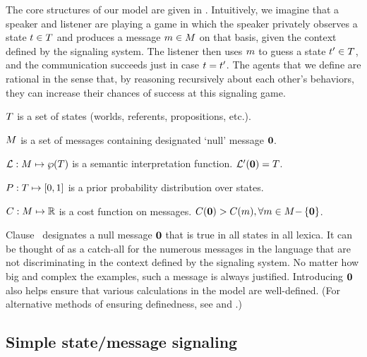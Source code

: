\documentclass{article}
\begin{document}
The core structures of our model are given in .
Intuitively, we imagine that a speaker and listener are playing a game
in which the speaker privately observes a state $t \in T$
and produces a message $m \in M$ on that basis, given the
context defined by the signaling system. The listener then uses $m$
to guess a state $t' \in T$, and the communication succeeds
just in case $t = t'$. The agents that we define are
rational in the sense that, by reasoning recursively about each
other's behaviors, they can increase their chances of success at this
signaling game.
%
\begin{examples}
\item\label{model}
  \begin{examples}
  \item\label{states}%
    $T$ is a set of states (worlds, referents, propositions, etc.).
  \item\label{messages}%
    $M$ is a set of messages containing designated `null' message $\mathbf{0}$.
  \item\label{lex}%
    $\mathcal{L}: M \mapsto \wp(T)$ is a semantic interpretation function. 
    $\mathcal{L}'(\mathbf{0}) = T$.
  \item\label{prior}%
    $P : T \mapsto [0,1]$ is a prior probability
    distribution over states.    
  \item\label{costs}%
    $C : M \mapsto \mathbb{R}$ is a cost function on messages.
    $C(\mathbf{0}) > C(m), {\forall m \in M{-}\left\{ \mathbf{0} \right\}}$.
  \end{examples}
\end{examples}

Clause~ designates a null message $\mathbf{0}$
that is true in all states in all lexica. It can be thought of as a
catch-all for the numerous messages in the language that are not
discriminating in the context defined by the signaling system.  No
matter how big and complex the examples, such a message is always
justified. Introducing $\mathbf{0}$ also helps ensure that various
calculations in the model are well-defined. (For alternative methods
of ensuring definedness, see \citealt{Jaeger:2011} and
\citealt{bergen-levy-goodman:2014}.)


\subsection{Simple state/message signaling}\label{sec:rsa}
\end{document}
